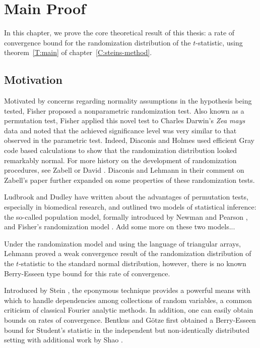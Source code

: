 \chapter{Main Proof}
\label{C:stein-proof} In this chapter, we prove the core theoretical
result of this thesis: a rate of convergence bound for the
randomization distribution of the $t$-statistic, using
theorem~\ref{T:main} of chapter~\ref{C:steins-method}.

\section{Motivation} Motivated by concerns regarding normality
assumptions in the hypothesis being tested, Fisher
\cite{fisher1935design} proposed a nonparametric randomization test.
Also known as a permutation test, Fisher applied this novel test to
Charles Darwin's \emph{Zea mays} data and noted that the achieved
significance level was very similar to that observed in the parametric
test.  Indeed, Diaconis and Holmes \cite{diaconis1994gray} used
efficient Gray code based calculations to show that the randomization
distribution looked remarkably normal.  For more history on the
development of randomization procedures, see Zabell
\cite{zabell2008student} or David \cite{david2008beginnings}.
Diaconis and Lehmann \cite{diaconis2008comment} in their comment on
Zabell's paper further expanded on some properties of these
randomization tests.

Ludbrook and Dudley \cite{ludbrook1998permutation} have written about
the advantages of permutation tests, especially in biomedical
research, and outlined two models of statistical inference: the
so-called population model, formally introduced by Newman and Pearson
\cite{neyman1928use}, and Fisher's randomization model
\cite{fisher1935design}.  Add some more on these two models...

Under the randomization model and using the language of triangular
arrays, Lehmann \cite{lehmann1999elements} proved a weak convergence
result of the randomization distribution of the $t$-statistic to the
standard normal distribution, however, there is no known Berry-Esseen
type bound for this rate of convergence.

Introduced by Stein \cite{stein1986approximate}, the eponymous
technique provides a powerful means with which to handle dependencies
among collections of random variables, a common criticism of classical
Fourier analytic methods.  In addition, one can easily obtain bounds
on rates of convergence.  Bentkus and G{\"o}tze
\cite{bentkus1996berry} first obtained a Berry-Esseen bound for
Student's statistic in the independent but non-identically distributed
setting with additional work by Shao \cite{shao2005explicit}.

